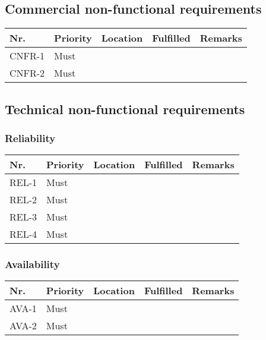 \begin{table}[H]
\begin{tabular}{lllll}
	\end{tabular}
\end{table}

\subsection{Commercial non-functional requirements}
\begin{table}[H]
	\begin{tabular}{lllll}
						    
		Nr.    & Priority & Location & Fulfilled & Remarks \\ \hline
		CNFR-1 & Must     & ~        & ~         & ~       \\ 
		CNFR-2 & Must     & ~        & ~         & ~       \\
						
	\end{tabular}
\end{table}

\subsection{Technical non-functional requirements}
\subsubsection{Reliability}
\begin{table}[H]
	\begin{tabular}{lllll}
						    
		Nr.   & Priority & Location & Fulfilled & Remarks \\ \hline
		REL-1 & Must     & ~        & ~         & ~       \\ 
		REL-2 & Must     & ~        & ~         & ~       \\ 
		REL-3 & Must     & ~        & ~         & ~       \\ 
		REL-4 & Must     & ~        & ~         & ~       \\
						
	\end{tabular}
\end{table}

\subsubsection{Availability}
\begin{table}[H]
	\begin{tabular}{lllll}
						    
		Nr.   & Priority & Location & Fulfilled & Remarks \\ \hline
		AVA-1 & Must     & ~        & ~         & ~       \\ 
		AVA-2 & Must     & ~        & ~         & ~       \\
						
	\end{tabular}
\end{table}

